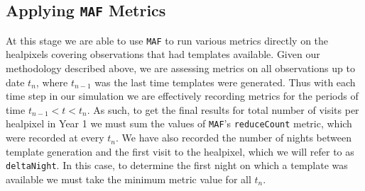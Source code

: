 \documentclass[preprintm,linenumbers]{aastex631}
\newcommand{\deltaNight}{\texttt{deltaNight}\xspace}
\newcommand{\reduceCount}{\texttt{reduceCount}\xspace}
\newcommand{\maf}{\texttt{MAF}\xspace}
\begin{document}
		
		\subsection{Applying \maf Metrics}
  \label{sec:applying_maf_metrics}
		
		At this stage we are able to use \maf to run various metrics directly on the healpixels covering observations that had templates available. 
Given our methodology described above, we are assessing metrics on all observations up to date $t_n$, where $t_{n-1}$ was the last time templates were generated.
Thus with each time step in our simulation we are effectively recording metrics for the periods of time $t_{n-1} < t < t_{n}$.
As such, to get the final results for total number of visits per healpixel in Year 1 we must sum the values of \maf's \reduceCount metric, which were recorded at every $t_n$.
We have also recorded the number of nights between template generation and the first visit to the healpixel, which we will refer to as \deltaNight.
In this case, to determine the first night on which a template was available we must take the minimum metric value for all $t_n$. 
		
\end{document}
